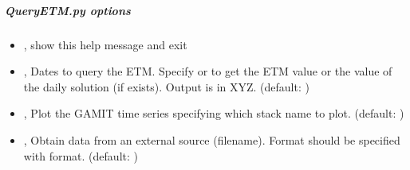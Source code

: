 \documentclass[letterpaper,10pt,english]{sphinxmanual}
\begin{document}
\subparagraph{QueryETM.py options}
\label{\detokenize{pgamit.com:QueryETM.py-options}}\begin{itemize}
\item {} 
\sphinxAtStartPar
{\hyperref[\detokenize{pgamit.com:QueryETM.py--h}]{}}, {\hyperref[\detokenize{pgamit.com:QueryETM.py---help}]{}} \sphinxhyphen{} show this help message and exit

\item {} 
\sphinxAtStartPar
{\hyperref[\detokenize{pgamit.com:QueryETM.py--q}]{}} , {\hyperref[\detokenize{pgamit.com:QueryETM.py---query}]{}}  \sphinxhyphen{} Dates to query the ETM. Specify  or  to get the ETM value or the value of the daily solution (if exists). Output is in XYZ. (default: )

\item {} 
\sphinxAtStartPar
{\hyperref[\detokenize{pgamit.com:QueryETM.py--gamit}]{}} , {\hyperref[\detokenize{pgamit.com:QueryETM.py---gamit}]{}}  \sphinxhyphen{} Plot the GAMIT time series specifying which stack name to plot. (default: )

\item {} 
\sphinxAtStartPar
{\hyperref[\detokenize{pgamit.com:QueryETM.py--file}]{}} , {\hyperref[\detokenize{pgamit.com:QueryETM.py---filename}]{}}  \sphinxhyphen{} Obtain data from an external source (filename). Format should be specified with \sphinxhyphen{}format. (default: )


\end{itemize}
\end{document}
